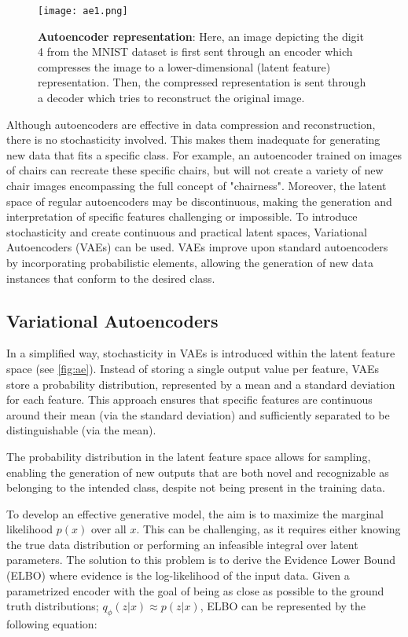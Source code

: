 \begin{figure}[!htb]
 \centering
 \texttt{[image: ae1.png]}
 \caption{\textbf{Autoencoder representation}: Here, an image depicting the digit 4 from the MNIST dataset is first sent through an encoder which compresses the image to a lower-dimensional (latent feature) representation. Then, the compressed representation is sent through a decoder which tries to reconstruct the original image.}
 \label{fig:ae}
\end{figure}

Although autoencoders are effective in data compression and reconstruction, there is no stochasticity involved. This makes them inadequate for generating new data that fits a specific class. For example, an autoencoder trained on images of chairs can recreate these specific chairs, but will not create a variety of new chair images encompassing the full concept of "chairness". Moreover, the latent space of regular autoencoders may be discontinuous, making the generation and interpretation of specific features challenging or impossible. To introduce stochasticity and create continuous and practical latent spaces, Variational Autoencoders (VAEs) can be used. VAEs improve upon standard autoencoders by incorporating probabilistic elements, allowing the generation of new data instances that conform to the desired class. 

\subsection{Variational Autoencoders}

In a simplified way, stochasticity in VAEs is introduced within the latent feature space (see \autoref{fig:ae}). Instead of storing a single output value per feature, VAEs store a probability distribution, represented by a mean and a standard deviation for each feature. This approach ensures that specific features are continuous around their mean (via the standard deviation) and sufficiently separated to be distinguishable (via the mean).

The probability distribution in the latent feature space allows for sampling, enabling the generation of new outputs that are both novel and recognizable as belonging to the intended class, despite not being present in the training data.

To develop an effective generative model, the aim is to maximize the marginal likelihood $p(x)$ over all $x$. This can be challenging, as it requires either knowing the true data distribution or performing an infeasible integral over latent parameters. The solution to this problem is to derive the Evidence Lower Bound (ELBO) where evidence is the log-likelihood of the input data. Given a parametrized encoder with the goal of being as close as possible to the ground truth distributions; $q_\phi(z|x)\approx p(z|x)$, ELBO can be represented by the following equation:

